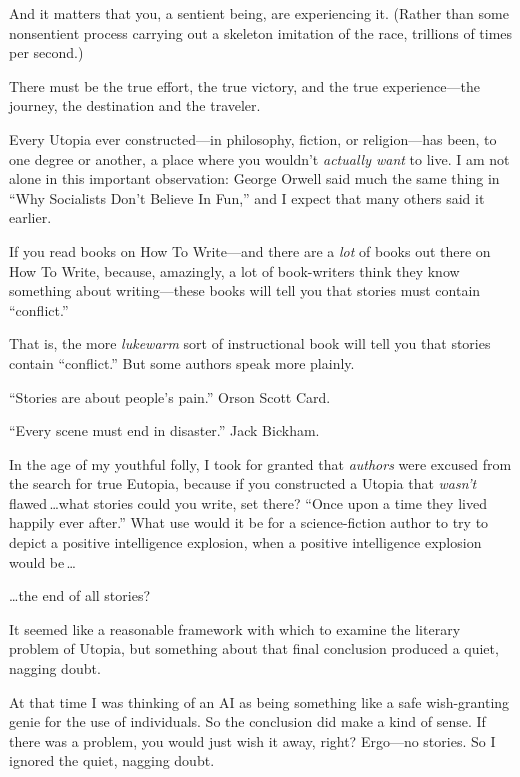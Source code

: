  And it matters that you, a sentient being, are experiencing it.
(Rather than some nonsentient process carrying out a skeleton imitation
of the race, trillions of times per second.)


 There must be the true effort, the true victory, and the true
experience---the journey, the destination and the traveler.

\myendsectiontext



 Every Utopia ever constructed---in philosophy, fiction, or
religion---has been, to one degree or another, a place where you
wouldn't \textit{actually want} to live. I am not alone
in this important observation: George Orwell said much the same thing
in ``Why Socialists Don't Believe In
Fun,'' and I expect that many others said it earlier.



 If you read books on How To Write---and there are a \textit{lot}
of books out there on How To Write, because, amazingly, a lot of
book-writers think they know something about writing---these books will
tell you that stories must contain
``conflict.''


 That is, the more \textit{lukewarm} sort of instructional book
will tell you that stories contain
``conflict.'' But some authors speak
more plainly.


 ``Stories are about people's
pain.'' Orson Scott Card.


 ``Every scene must end in
disaster.'' Jack Bickham.


 In the age of my youthful folly, I took for granted that
\textit{authors} were excused from the search for true Eutopia, because
if you constructed a Utopia that \textit{wasn't} flawed\,\ldots what stories could you write, set there? ``Once
upon a time they lived happily ever after.'' What use
would it be for a science-fiction author to try to depict a positive
intelligence explosion, when a positive intelligence explosion would be\,\ldots


 \ldots the end of all stories?


 It seemed like a reasonable framework with which to examine the
literary problem of Utopia, but something about that final conclusion
produced a quiet, nagging doubt.


 At that time I was thinking of an AI as being something like a
safe wish-granting genie for the use of individuals. So the conclusion
did make a kind of sense. If there was a problem, you would just wish
it away, right? Ergo---no stories. So I ignored the quiet, nagging
doubt.


